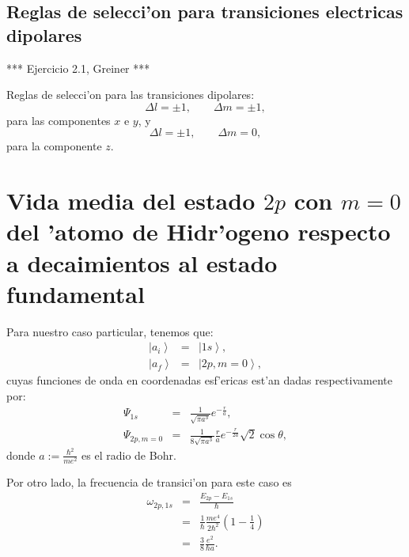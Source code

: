 \subsection{Reglas de selecci'on para transiciones electricas dipolares}

*** Ejercicio 2.1, Greiner ***


Reglas de selecci'on para las transiciones dipolares:
\begin{equation}
\Delta l=\pm1, \qquad \Delta m=\pm 1,
\end{equation} 
para las componentes $x$ e $y$, y
\begin{equation}
\Delta l=\pm1, \qquad \Delta m=0,
\end{equation} 
para la componente $z$.

\section{Vida media del estado $2p$ con $m=0$ del 'atomo de Hidr'ogeno respecto
a decaimientos al estado fundamental}

Para nuestro caso particular, tenemos que:
\begin{eqnarray}
\left| a_i\right\rangle  & = &\left| 1s\right\rangle  ,\\
\left| a_f\right\rangle  & = &\left| 2p,m=0\right\rangle  ,
\end{eqnarray}
cuyas funciones de onda en coordenadas esf'ericas est'an dadas
respectivamente por:
\begin{eqnarray}
\Psi_{1s} & = &\frac{1}{\sqrt{\pi a^3}}e^{-\frac{r}{a}} ,\\
\Psi_{2p,m=0} & = &\frac{1}{8\sqrt{\pi a^3}}\frac{r}{a}%
e^{-\frac{r}{2a}}\sqrt{2}\cos\theta ,
\end{eqnarray}
donde $a:=\frac{\hbar^2}{me^2}$ es el radio de Bohr.

Por otro lado, la frecuencia de transici'on para este caso es 
\begin{eqnarray}
\omega_{2p,1s} & = &\frac{E_{2p}-E_{1s}}{\hbar}\\
& = &\frac{1}{\hbar}\frac{me^{4}}{2\hbar^2}\left( 1-\frac{1}{4}\right) \\
& = &\frac{3}{8}\frac{e^2}{\hbar a} .
\end{eqnarray}

